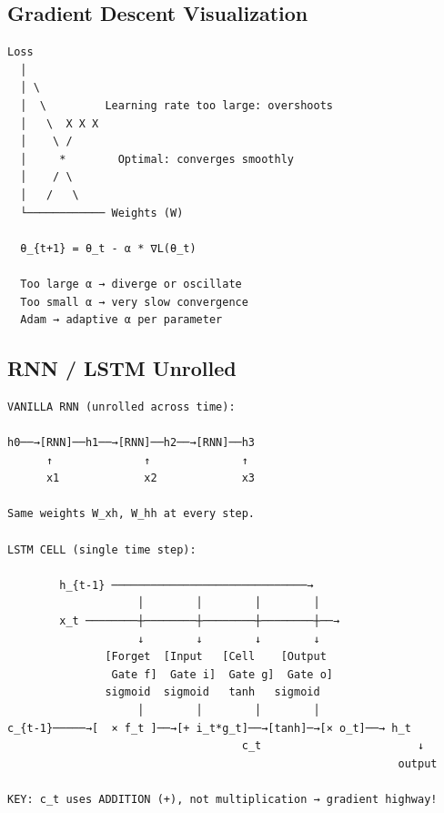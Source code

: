 \documentclass[11pt]{article}
\begin{document}

\subsection{Gradient Descent Visualization}\label{gradient-descent-visualization}

\setcodelang{}

\begin{verbatim}
Loss
  │
  │ \
  │  \         Learning rate too large: overshoots
  │   \  X X X
  │    \ /
  │     *        Optimal: converges smoothly
  │    / \
  │   /   \
  └──────────── Weights (W)
  
  θ_{t+1} = θ_t - α * ∇L(θ_t)
  
  Too large α → diverge or oscillate
  Too small α → very slow convergence
  Adam → adaptive α per parameter
\end{verbatim}

\subsection{RNN / LSTM Unrolled}\label{rnn--lstm-unrolled}

\setcodelang{}

\begin{verbatim}
VANILLA RNN (unrolled across time):

h0──→[RNN]──h1──→[RNN]──h2──→[RNN]──h3
      ↑              ↑              ↑
      x1             x2             x3
      
Same weights W_xh, W_hh at every step.

LSTM CELL (single time step):

        h_{t-1} ──────────────────────────────→
                    │        │        │        │
        x_t ────────┼────────┼────────┼────────┼──→
                    ↓        ↓        ↓        ↓
               [Forget  [Input   [Cell    [Output
                Gate f]  Gate i]  Gate g]  Gate o]
               sigmoid  sigmoid   tanh   sigmoid
                    │        │        │        │
c_{t-1}─────→[  × f_t ]──→[+ i_t*g_t]──→[tanh]─→[× o_t]──→ h_t
                                    c_t                        ↓
                                                            output
                                                            
KEY: c_t uses ADDITION (+), not multiplication → gradient highway!
\end{verbatim}
\end{document}
